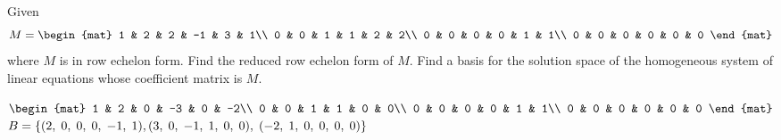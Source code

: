 
\begin{Exercise}[
name={},
title={}, 
difficulty=0,
origin={\cite{YL}}]
Given
\[
M=\begin{mat}
1 & 2 & 2 & -1 & 3 & 1\\
0 & 0 & 1 & 1  & 2 & 2\\
0 & 0 & 0 & 0 & 1 & 1\\
0 & 0 & 0 & 0 & 0 & 0
\end{mat}
\]
where $M$ is in row echelon form.
\Question Find the reduced row echelon form of $M$.
\Question Find a basis for the solution space of the 
homogeneous system of linear equations whose coefficient 
matrix is $M$.
\end{Exercise}

\begin{Answer}
\Question $\begin{mat}
1 & 2 & 0 & -3 & 0 & -2\\
0 & 0 & 1 & 1  & 0 & 0\\
0 & 0 & 0 & 0  & 1 & 1\\
0 & 0 & 0 & 0 & 0 & 0
\end{mat}$
\Question $B=\{(2,\;0,\;0,\;0,\;-1,\;1),\\(3,\;0,\;-1,\;1,\;0,\;0),\;(-2,\;1,\;0,\;0,\;0,\;0)\}$
\end{Answer}
